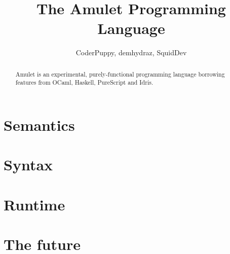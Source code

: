 \documentclass[notitlepage]{report}
\title{The Amulet Programming Language}
\author{CoderPuppy, demhydraz, SquidDev}
\begin{document}
\maketitle

\begin{abstract}
Amulet is an experimental, purely-functional programming language borrowing features from OCaml, Haskell, PureScript and Idris.
\end{abstract}

\tableofcontents

\chapter{Semantics}





\chapter{Syntax}






\chapter{Runtime}




\chapter{The future}


\printbibliography
\end{document}
